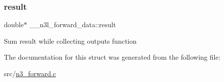 \subsubsection{\texorpdfstring{result}{result}}
{\footnotesize\ttfamily double$\ast$ \+\_\+\+\_\+n3l\+\_\+forward\+\_\+data\+::result}

Sum result while collecting outputs function 

The documentation for this struct was generated from the following file\+:\begin{DoxyCompactItemize}
\item 
src/\hyperlink{n3__forward_8c}{n3\+\_\+forward.\+c}\end{DoxyCompactItemize}
